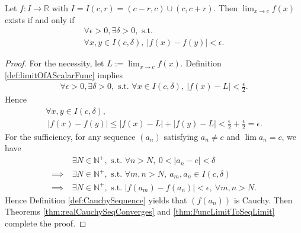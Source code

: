 \begin{thm}
  \label{thm:FuncLimitCauchyCriterion}
  Let $f:I\rightarrow \mathbb{R}$ with
  $I=I(c,r)=(c-r,c)\cup (c,c+r)$.
  Then $\lim_{x\rightarrow c}f(x)$ exists if and only if
  \begin{equation}
    \begin{array}{l}
      \forall \epsilon>0, \exists \delta>0,\text{ s.t. }\\
      \forall x,y\in I(c,\delta),\ |f(x)-f(y)|<\epsilon.
    \end{array}
  \end{equation}
\end{thm}
\begin{proof}
  For the necessity, let $L:=\lim_{x\rightarrow c}f(x)$. Definition
  \ref{def:limitOfAScalarFunc} implies
  \begin{displaymath}
    \begin{array}{l}
      \forall \epsilon>0, \exists \delta>0,\text{ s.t. }
      \forall x\in I(c,\delta),\ |f(x)-L|<\frac{\epsilon}{2}.
    \end{array}
  \end{displaymath}
  Hence 
  \begin{displaymath}
    \begin{array}{l}
      \forall x,y\in I(c,\delta),\\
      \ |f(x)-f(y)|\le |f(x)-L|+|f(y)-L|
      <\frac{\epsilon}{2}+\frac{\epsilon}{2}=\epsilon.
    \end{array}
  \end{displaymath}
  For the sufficiency, for any sequence $(a_{n})$
  satisfying $a_{n}\neq c$ and $\lim a_{n}=c$, we have
  \begin{align*}
    &\ \exists N\in \mathbb{N}^{+}, \text{ s.t. }\forall n>N,\
      0<|a_{n}-c|<\delta\\
    \implies &\ \exists N\in \mathbb{N}^{+},
                  \text{ s.t. }\forall m,n>N,\ a_{m},a_{n}\in I(c,\delta)\\
    \implies &\ \exists N\in \mathbb{N}^{+},
                  \text{ s.t. } |f(a_{m})-f(a_{n})|<\epsilon,\
                  \forall m,n>N.
  \end{align*}
  Hence Definition \ref{def:CauchySequence} yields that
  $(f(a_{n}))$ is Cauchy. Then
  Theorems \ref{thm:realCauchySeqConverges} and
  \ref{thm:FuncLimitToSeqLimit} complete the proof.
\end{proof}

